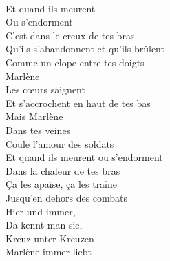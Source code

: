 \\
Et quand ils meurent\\
Ou s'endorment\\
C'est dans le creux de tes bras\\
Qu'ils s'abandonnent et qu'ils brûlent\\
Comme un clope entre tes doigts\\
Marlène\\
Les cœurs saignent\\
Et s'accrochent en haut de tes bas\\
Mais Marlène\\
Dans tes veines\\
Coule l'amour des soldats\\
Et quand ils meurent ou s'endorment\\
Dans la chaleur de tes bras\\
Ça les apaise, ça les traîne\\
Jusqu'en dehors des combats\\
Hier und immer,\\
Da kennt man sie,\\
Kreuz unter Kreuzen\\
Marlène immer liebt\\
